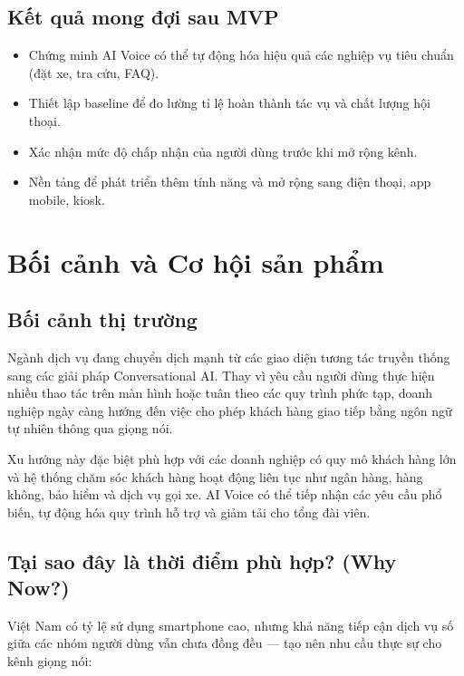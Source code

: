 \documentclass[12pt,a4paper]{article}
\begin{document}
\subsection*{Kết quả mong đợi sau MVP}
\begin{itemize}
  \item Chứng minh AI Voice có thể tự động hóa hiệu quả các nghiệp vụ tiêu chuẩn (đặt xe, tra cứu, FAQ).
  \item Thiết lập baseline để đo lường tỉ lệ hoàn thành tác vụ và chất lượng hội thoại.
  \item Xác nhận mức độ chấp nhận của người dùng trước khi mở rộng kênh.
  \item Nền tảng để phát triển thêm tính năng và mở rộng sang điện thoại, app mobile, kiosk.
\end{itemize}

\section{Bối cảnh và Cơ hội sản phẩm}

\subsection{Bối cảnh thị trường}

Ngành dịch vụ đang chuyển dịch mạnh từ các giao diện tương tác truyền thống sang các giải pháp Conversational AI. Thay vì yêu cầu người dùng thực hiện nhiều thao tác trên màn hình hoặc tuân theo các quy trình phức tạp, doanh nghiệp ngày càng hướng đến việc cho phép khách hàng giao tiếp bằng ngôn ngữ tự nhiên thông qua giọng nói.

Xu hướng này đặc biệt phù hợp với các doanh nghiệp có quy mô khách hàng lớn và hệ thống chăm sóc khách hàng hoạt động liên tục như ngân hàng, hàng không, bảo hiểm và dịch vụ gọi xe. AI Voice có thể tiếp nhận các yêu cầu phổ biến, tự động hóa quy trình hỗ trợ và giảm tải cho tổng đài viên.

\subsection{Tại sao đây là thời điểm phù hợp? (Why Now?)}

Việt Nam có tỷ lệ sử dụng smartphone cao, nhưng khả năng tiếp cận dịch vụ số giữa các nhóm người dùng vẫn chưa đồng đều --- tạo nên nhu cầu thực sự cho kênh giọng nói:
\end{document}
